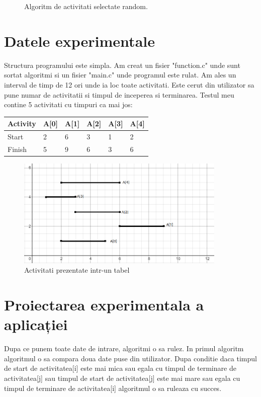 \documentclass[12pt]{article}
\begin{document}
{\begin{figure}[h]
\begin{center}
\begin{tabbing}
\end{tabbing}
\caption{Algoritm de activitati selectate random.}
\label{fig_alg_ex}
\end{center}
\end{figure}
\vspace{20 mm} %

\section{Datele experimentale}
Structura programului este simpla. Am creat un fisier "function.c" unde sunt sortat algoritmi si un fisier "main.c" unde programul este rulat. Am ales un interval de timp de 12 ori unde ia loc toate activitati. Este cerut din utilizator sa pune numar de activitatii si timpul de inceperea si terminarea. Testul meu contine 5 activitati cu timpuri ca mai jos:

\begin{center}
\begin{tabular}{| m{5em}|m{1cm}|m{1cm}|m{1cm}| m{1cm}|m{1cm} } 
\hline
Activity & A[0] & A[1] & A[2] & A[3] & A[4] \\ 
\hline
Start & 2 & 6 & 3 & 1 & 2 \\ 
\hline
Finish & 5 & 9 & 6 & 3 & 6 \\ 
\hline
\end{tabular}
\end{center}

\begin{figure}[htp]
    \centering
    \includegraphics[width=10cm]{graph1.png}
    \caption{Activitati prezentate intr-un tabel}
    \label{fig:graph1}
\end{figure}


\section{Proiectarea experimentala a aplicației}
Dupa ce punem toate date de intrare, algoritmi o sa rulez. In primul algoritm algoritmul o sa compara doua date puse din utilizator. Dupa conditie daca timpul de start de activitatea[i] este mai mica sau egala cu timpul de terminare de activitatea[j] sau timpul de start de activitatea[j] este mai mare sau egala cu timpul de terminare de activitatea[i] algoritmul o sa ruleaza cu succes.

}
\end{document}
